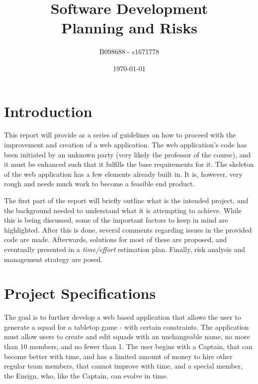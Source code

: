 \documentclass[12pt,a4paper]{article}
\begin{document}
\title{Software Development\\Planning and Risks}
\author{B098688 - s1671778}
\date{\today}

\makeEPCCtitle

\thispagestyle{empty}

\newpage


\tableofcontents


\newpage
{}

\section{Introduction}

This report will provide as a series of guidelines on how to proceed with the improvement and creation of a web application. The web application's code has been initiated by an unknown party (very likely the professor of the course), and it must be enhanced such that it fulfills the base requirements for it. The skeleton of the web application has a few elements already built in. It is, however, very rough and needs much work to become a feasible end product. 

The first part of the report will briefly outline what is the intended project, and the background needed to understand what it is attempting to achieve. While this is being discussed, some of the important factors to keep in mind are highlighted. After this is done, several comments regarding issues in the provided code are made. Afterwards, solutions for most of these are proposed, and eventually presented in a \textit{time/effort} estimation plan. Finally, risk analysis and management strategy are posed.

\section{Project Specifications}

The goal is to further develop a web based application that allows the user to generate a squad for a tabletop game - with certain constraints. The application must allow users to create and edit squads with an unchangeable name, no more than 10 members, and no fewer than 1. The user begins with a Captain, that can become better with time, and has a limited amount of money to hire other regular team members, that cannot improve with time, and a special member, the Ensign, who, like the Captain, can evolve in time.
\end{document}

